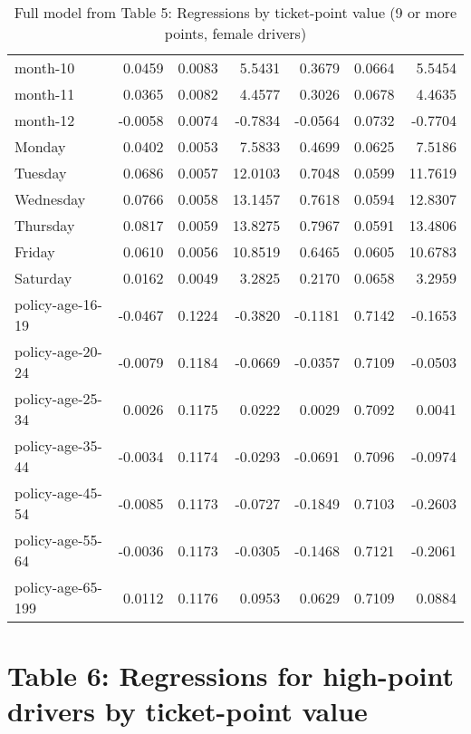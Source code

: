 \documentclass[10pt]{article}
\begin{document}
\begin{table}[ht]
\begin{tabular}{lrrrrrr}
  month-10 & 0.0459 & 0.0083 & 5.5431 & 0.3679 & 0.0664 & 5.5454 \\ 
  month-11 & 0.0365 & 0.0082 & 4.4577 & 0.3026 & 0.0678 & 4.4635 \\ 
  month-12 & -0.0058 & 0.0074 & -0.7834 & -0.0564 & 0.0732 & -0.7704 \\ 
  Monday & 0.0402 & 0.0053 & 7.5833 & 0.4699 & 0.0625 & 7.5186 \\ 
  Tuesday & 0.0686 & 0.0057 & 12.0103 & 0.7048 & 0.0599 & 11.7619 \\ 
  Wednesday & 0.0766 & 0.0058 & 13.1457 & 0.7618 & 0.0594 & 12.8307 \\ 
  Thursday & 0.0817 & 0.0059 & 13.8275 & 0.7967 & 0.0591 & 13.4806 \\ 
  Friday & 0.0610 & 0.0056 & 10.8519 & 0.6465 & 0.0605 & 10.6783 \\ 
  Saturday & 0.0162 & 0.0049 & 3.2825 & 0.2170 & 0.0658 & 3.2959 \\ 
  policy-age-16-19 & -0.0467 & 0.1224 & -0.3820 & -0.1181 & 0.7142 & -0.1653 \\ 
  policy-age-20-24 & -0.0079 & 0.1184 & -0.0669 & -0.0357 & 0.7109 & -0.0503 \\ 
  policy-age-25-34 & 0.0026 & 0.1175 & 0.0222 & 0.0029 & 0.7092 & 0.0041 \\ 
  policy-age-35-44 & -0.0034 & 0.1174 & -0.0293 & -0.0691 & 0.7096 & -0.0974 \\ 
  policy-age-45-54 & -0.0085 & 0.1173 & -0.0727 & -0.1849 & 0.7103 & -0.2603 \\ 
  policy-age-55-64 & -0.0036 & 0.1173 & -0.0305 & -0.1468 & 0.7121 & -0.2061 \\ 
  policy-age-65-199 & 0.0112 & 0.1176 & 0.0953 & 0.0629 & 0.7109 & 0.0884 \\ 
   \hline
\end{tabular}
\caption{Full model from Table 5: Regressions by ticket-point value (9 or more points, female drivers)} 
\label{tab_5_9plus_pts_F}
\end{table}


\clearpage
\pagebreak




\section{Table 6: Regressions for high-point drivers by ticket-point value}
\end{document}
